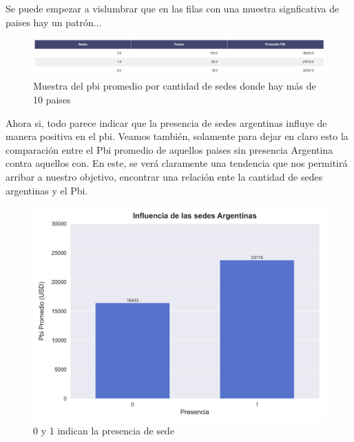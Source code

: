 \documentclass[10pt,a4paper]{article}
\begin{document}
\newpage

Se puede empezar a vislumbrar que en las filas con una muestra signficativa de paises hay un patrón... 

\begin{figure}[h!]
  \centering
  \includegraphics[width=1\textwidth]{TABLAConclusion.png}
  \caption{Muestra del pbi promedio por cantidad de sedes donde hay más de 10 paises }
  \label{fig:Tabla Conclusion}
\end{figure} \vspace{0.1cm}

Ahora si, todo parece indicar que la presencia de sedes argentinas influye de manera positiva en el pbi. Veamos también, solamente para dejar en claro esto la comparación entre el Pbi promedio de aquellos paises sin presencia Argentina contra aquellos con. En este, se verá claramente una tendencia que nos permitirá arribar a nuestro objetivo, encontrar una relación ente la cantidad de sedes argentinas y el Pbi.

\begin{figure}[h!]
  \centering
  \includegraphics[width=1\textwidth]{plot_conclusion.png}
  \caption{0 y 1 indican la presencia de sede}
  \label{fig: 0 y 1 indican la presencia de sedes}
\end{figure} \vspace{0.1cm}

\newpage
\end{document}
